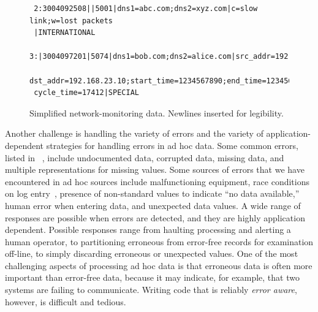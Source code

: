 \begin{figure}
  \centering
  \small
\begin{verbatim}
 2:3004092508||5001|dns1=abc.com;dns2=xyz.com|c=slow link;w=lost packets
 |INTERNATIONAL
 3:|3004097201|5074|dns1=bob.com;dns2=alice.com|src_addr=192.168.0.10;
 dst_addr=192.168.23.10;start_time=1234567890;end_time=1234568000;
 cycle_time=17412|SPECIAL
\end{verbatim}  
  \caption{Simplified network-monitoring data. Newlines 
inserted for legibility.}
  \label{fig:darkstar-records1}
\end{figure}



Another challenge is handling the variety of errors and the
variety of application-dependent strategies for handling errors in ad
hoc data.  Some common errors, listed in ~,
include undocumented data, corrupted data, missing data, and multiple
representations for missing values.  Some sources of errors
that we have encountered in ad hoc sources include malfunctioning
equipment, race conditions on log entry~\cite{wpp}, presence of
non-standard values to indicate ``no data available,'' human error
when entering data, and unexpected data values.  A wide range of
responses are possible when errors are detected, and they are highly
application dependent.  Possible responses range from haulting processing
and alerting a human operator, to partitioning erroneous from error-free
records for examination off-line, to simply discarding erroneous or
unexpected values.  One of the most challenging aspects of processing
ad hoc data is that erroneous data is often more important than
error-free data, because it may indicate, for example, that two
systems are failing to communicate.  Writing code that is reliably
\emph{error aware}, however, is difficult and tedious.


